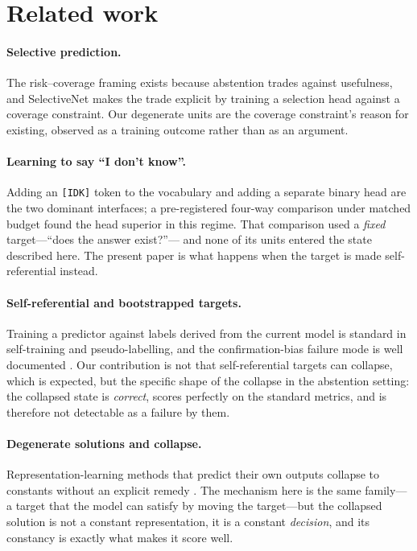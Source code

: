 \documentclass[11pt]{article}
\begin{document}
\section{Related work}
\label{sec:related}

\paragraph{Selective prediction.} The risk--coverage framing
\citep{elyaniv2010selective, geifman2017selective} exists because abstention trades against
usefulness, and SelectiveNet \citep{geifman2019selectivenet} makes the trade explicit by training a
selection head against a coverage constraint. Our degenerate units are the coverage constraint's
reason for existing, observed as a training outcome rather than as an argument.

\paragraph{Learning to say ``I don't know''.} Adding an \texttt{[IDK]} token to the vocabulary
\citep{cohen2024idk} and adding a separate binary head are the two dominant interfaces; a
pre-registered four-way comparison under matched budget \citep{speranza2026abstention} found the head
superior in this regime. That comparison used a \emph{fixed} target---``does the answer exist?''---
and none of its units entered the state described here. The present paper is what happens when the
target is made self-referential instead.

\paragraph{Self-referential and bootstrapped targets.} Training a predictor against labels derived
from the current model is standard in self-training and pseudo-labelling, and the confirmation-bias
failure mode is well documented \citep{arazo2020pseudo}. Our contribution is not that
self-referential targets can collapse, which is expected, but the specific shape of the collapse in
the abstention setting: the collapsed state is \emph{correct}, scores perfectly on the standard
metrics, and is therefore not detectable as a failure by them.

\paragraph{Degenerate solutions and collapse.} Representation-learning methods that predict their own
outputs collapse to constants without an explicit remedy \citep{grill2020byol, chen2021simsiam}. The
mechanism here is the same family---a target that the model can satisfy by moving the target---but
the collapsed solution is not a constant representation, it is a constant \emph{decision}, and its
constancy is exactly what makes it score well.
\end{document}
